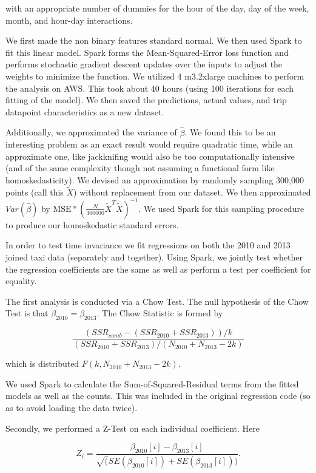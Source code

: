 \documentclass[twoside]{article}
\begin{document}
\begin{multicols}{2}
\noindent with an appropriate number of dummies for the hour of the day, day of the week, month, and hour-day interactions. 

We first made the non binary features standard normal. We then used Spark to fit this linear model. Spark forms the Mean-Squared-Error loss function and performs stochastic gradient descent updates over the inputs to adjust the weights to minimize the function. We utilized 4 m3.2xlarge machines to perform the analysis on AWS. This took about 40 hours (using 100 iterations for each fitting of the model). We then saved the predictions, actual values, and trip datapoint characteristics as a new dataset. 

Additionally, we approximated the variance of $\hat{\beta}$. We found this to be an interesting problem as an exact result would require quadratic time, while an approximate one, like jackknifing would also be too computationally intensive (and of the same complexity though not assuming a functional form like homoskedasticity).  We devised an approximation by randomly sampling 300,000 points (call this $\tilde{X}$) without replacement from our dataset. We then approximated $Var(\hat{\beta})$ by $\text{MSE}*(\frac{N}{300000}\tilde{X}^T\tilde{X})^{-1}$. We used Spark for this sampling procedure to produce our homoskedastic standard errors. 

In order to test time invariance we fit regressions on both the 2010 and 2013 joined taxi data (separately and together). Using Spark, we jointly test whether the regression coefficients are the same as well as perform a test per coefficient for equality. 

The first analysis is conducted via a Chow Test.  The null hypothesis of the Chow Test is that $\beta_{2010} = \beta_{2013}$.  The Chow Statistic is formed by 

$$\frac{(SSR_{comb} - (SSR_{2010} + SSR_{2013}))/k}{(SSR_{2010} + SSR_{2013})/(N_{2010} + N_{2013}-2k)}$$

\noindent which is distributed $F(k, N_{2010} + N_{2013}-2k)$. \cite{CHOW}  

We used Spark to calculate the Sum-of-Squared-Residual terms from the fitted models as well as the counts. This was included in the original regression code (so as to avoid loading the data twice). 

Secondly, we performed a Z-Test on each individual coefficient. Here

$$ Z_i = \frac{\beta_{2010}[i] - \beta_{2013}[i]}{\sqrt(SE(\beta_{2010}[i]) + SE(\beta_{2013}[i]))}.$$

\end{multicols}
\end{document}
